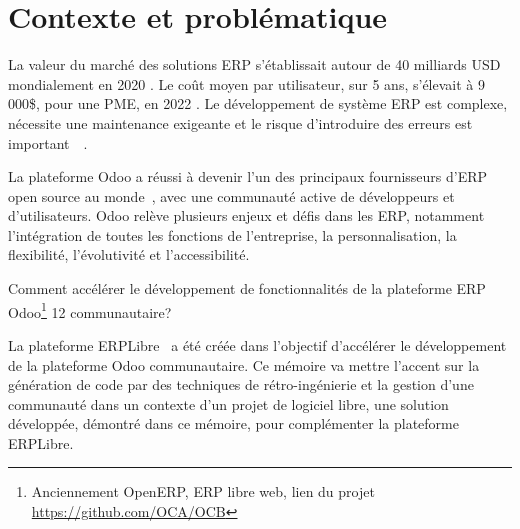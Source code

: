 \label{sec:Introduction}  %


\section{Contexte et problématique}

La valeur du marché des solutions ERP s'établissait autour de 40 milliards USD mondialement en 2020 \cite{mordorintelligence_erp_2023,bigbang_erp_2023}. Le coût moyen par utilisateur, sur 5 ans, s'élevait à 9 000\$, pour une PME, en 2022 \cite{softwarepath_erp_2023}. Le développement de système ERP est complexe, nécessite une maintenance exigeante et le risque d’introduire des erreurs est important~\cite{method_erp_system_2022}~\cite{wu_2006}.

La plateforme Odoo a réussi à devenir l'un des principaux fournisseurs d'ERP open source au monde~\cite{ingenierie_system_information_hotel_odoo_2020}, avec une communauté active de développeurs et d'utilisateurs. Odoo relève plusieurs enjeux et défis dans les ERP, notamment l'intégration de toutes les fonctions de l'entreprise, la personnalisation, la flexibilité, l'évolutivité et l'accessibilité.

Comment accélérer le développement de fonctionnalités de la plateforme ERP Odoo\footnote{Anciennement OpenERP, ERP libre web, lien du projet \url{https://github.com/OCA/OCB}} 12 communautaire?

La plateforme ERPLibre~\cite{ref_erplibre} a été créée dans l’objectif d’accélérer le développement de la plateforme Odoo communautaire. Ce mémoire va mettre l’accent sur la génération de code par des techniques de rétro-ingénierie et la gestion d’une communauté dans un contexte d’un projet de logiciel libre, une solution développée, démontré dans ce mémoire, pour complémenter la plateforme ERPLibre.


